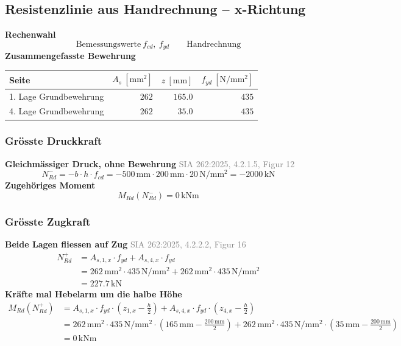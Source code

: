 \documentclass[11pt,a4paper]{article}
\newcommand{\normref}[1]{{\small\textcolor{gray}{#1}}}
\begin{document}
\subsection{Resistenzlinie aus Handrechnung – x-Richtung}
\noindent\textbf{Rechenwahl}
\begin{equation*}
\text{Bemessungswerte}\ f_{cd},\ f_{yd} \qquad \text{Handrechnung}
\end{equation*}
\noindent\textbf{Zusammengefasste Bewehrung}
\begin{longtable}{lrrr}
\hline
Seite & $A_s\ [\mathrm{mm}^2]$ & $z\ [\mathrm{mm}]$ & $f_{yd}\ [\mathrm{N/mm^2}]$ \\
\hline
\endhead
1. Lage Grundbewehrung & $262$ & $165.0$ & $435$ \\
4. Lage Grundbewehrung & $262$ & $35.0$ & $435$ \\
\hline
\end{longtable}
\subsubsection{Grösste Druckkraft}
\noindent\textbf{Gleichmässiger Druck, ohne Bewehrung} \hfill \normref{SIA 262:2025, 4.2.1.5, Figur 12}
\begin{equation*}
N_{Rd}^{-} = -b \cdot h \cdot f_{cd} = -500\,\mathrm{mm} \cdot 200\,\mathrm{mm} \cdot 20\,\mathrm{N}/\mathrm{mm}^{2} = -2000\,\mathrm{kN}
\end{equation*}
\noindent\textbf{Zugehöriges Moment}
\begin{equation*}
M_{Rd}(N_{Rd}^{-}) = 0\,\mathrm{kNm}
\end{equation*}
\subsubsection{Grösste Zugkraft}
\noindent\textbf{Beide Lagen fliessen auf Zug} \hfill \normref{SIA 262:2025, 4.2.2.2, Figur 16}
\begin{equation*}
\begin{aligned}
  N_{Rd}^{+} &= A_{s,1,x} \cdot f_{yd} + A_{s,4,x} \cdot f_{yd} \\
  &= 262\,\mathrm{mm}^{2} \cdot 435\,\mathrm{N}/\mathrm{mm}^{2} + 262\,\mathrm{mm}^{2} \cdot 435\,\mathrm{N}/\mathrm{mm}^{2} \\
  &= 227.7\,\mathrm{kN}
\end{aligned}
\end{equation*}
\noindent\textbf{Kräfte mal Hebelarm um die halbe Höhe}
\begin{equation*}
\begin{aligned}
  M_{Rd}(N_{Rd}^{+}) &= A_{s,1,x} \cdot f_{yd} \cdot \left(z_{1,x} - \tfrac{h}{2}\right) + A_{s,4,x} \cdot f_{yd} \cdot \left(z_{4,x} - \tfrac{h}{2}\right) \\
  &= 262\,\mathrm{mm}^{2} \cdot 435\,\mathrm{N}/\mathrm{mm}^{2} \cdot \left(165\,\mathrm{mm} - \tfrac{200\,\mathrm{mm}}{2}\right) + 262\,\mathrm{mm}^{2} \cdot 435\,\mathrm{N}/\mathrm{mm}^{2} \cdot \left(35\,\mathrm{mm} - \tfrac{200\,\mathrm{mm}}{2}\right) \\
  &= 0\,\mathrm{kNm}
\end{aligned}
\end{equation*}
\end{document}
